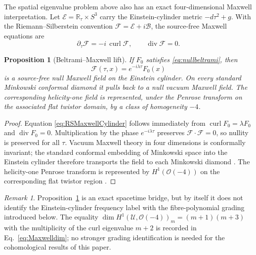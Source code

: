 \documentclass[aps,prd,reprint,nofootinbib,superscriptaddress]{revtex4-2}
\newtheorem{proposition}[theorem]{Proposition}
\theoremstyle{definition}
\theoremstyle{remark}
\newtheorem{remark}[theorem]{Remark}
\newcommand{\cO}{\mathcal{O}}
\newcommand{\cU}{\mathcal{U}}
\newcommand{\Div}{\operatorname{div}}
\newcommand{\Curl}{\operatorname{curl}}
\begin{document}
The spatial eigenvalue problem above also has an exact four-dimensional Maxwell interpretation.  Let
\(\mathcal E=\mathbb R_\tau\times S^3\) carry the Einstein-cylinder metric
\(-d\tau^2+g\).  With the Riemann--Silberstein convention
\(\mathcal F=\mathcal E+i\mathcal B\), the source-free Maxwell equations are
\begin{equation}
 \partial_\tau\mathcal F=-i\,\Curl\mathcal F,
 \qquad \Div\mathcal F=0.
\label{eq:RSMaxwellCylinder}
\end{equation}

\begin{proposition}[Beltrami--Maxwell lift]
\label{prop:BeltramiMaxwellLift}
If $F_0$ satisfies \eqref{eq:nullbeltrami}, then
\begin{equation}
 \mathcal F(\tau,x)=e^{-i\lambda\tau}F_0(x)
\label{eq:BeltramiMaxwellLift}
\end{equation}
is a source-free null Maxwell field on the Einstein cylinder.  On every standard Minkowski conformal diamond it pulls back to a null vacuum Maxwell field.  The corresponding helicity-one field is represented, under the Penrose transform on the associated flat twistor domain, by a class of homogeneity $-4$.
\end{proposition}

\begin{proof}
Equation \eqref{eq:RSMaxwellCylinder} follows immediately from
$\Curl F_0=\lambda F_0$ and $\Div F_0=0$.  Multiplication by the phase
$e^{-i\lambda\tau}$ preserves $\mathcal F\cdot\mathcal F=0$, so nullity is preserved for all $\tau$.  Vacuum Maxwell theory in four dimensions is conformally invariant; the standard conformal embedding of Minkowski space into the Einstein cylinder therefore transports the field to each Minkowski diamond \cite{KopinskiNatario2017}.  The helicity-one Penrose transform is represented by $H^1(\cO(-4))$ on the corresponding flat twistor region \cite{WardWells1990}.
\end{proof}

\begin{remark}
Proposition~\ref{prop:BeltramiMaxwellLift} is an exact spacetime bridge, but by itself it does not identify the Einstein-cylinder frequency label with the fibre-polynomial grading introduced below.  The equality
$\dim H^1(\cU,\cO(-4))_m=(m+1)(m+3)$ with the multiplicity of the curl eigenvalue $m+2$ is recorded in Eq.~\eqref{eq:Maxwelldim}; no stronger grading identification is needed for the cohomological results of this paper.
\end{remark}
\end{document}
